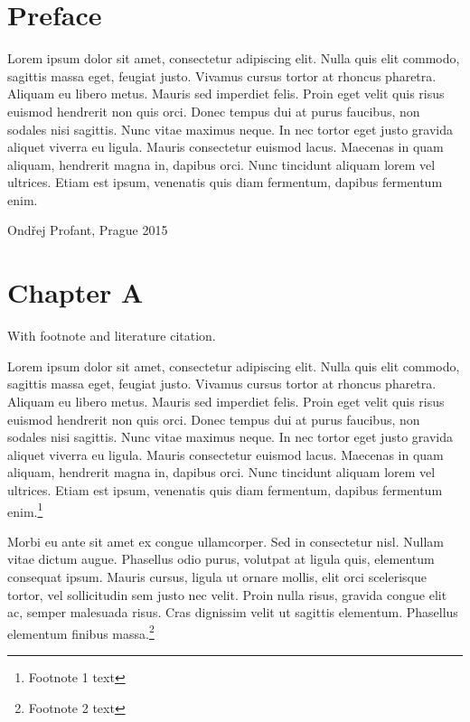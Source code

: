 
\def\mytitle{Example book}
\def\myauthor{John Doe}
\def\latexmode{memoir}
\def\blackandwhite{true}
\def\usexelatex{true}
\usepackage{tabularx}


\chapter{Preface}
\label{preface}

Lorem ipsum dolor sit amet, consectetur adipiscing elit. Nulla quis elit commodo, sagittis massa eget, feugiat justo. Vivamus cursus tortor at rhoncus pharetra. Aliquam eu libero metus. Mauris sed imperdiet felis. Proin eget velit quis risus euismod hendrerit non quis orci. Donec tempus dui at purus faucibus, non sodales nisi sagittis. Nunc vitae maximus neque. In nec tortor eget justo gravida aliquet viverra eu ligula. Mauris consectetur euismod lacus. Maecenas in quam aliquam, hendrerit magna in, dapibus orci. Nunc tincidunt aliquam lorem vel ultrices. Etiam est ipsum, venenatis quis diam fermentum, dapibus fermentum enim.

Ondřej Profant, Prague 2015

\chapter{Chapter A}
\label{chaptera}

With footnote and literature citation.

Lorem ipsum dolor sit amet, consectetur adipiscing elit. Nulla quis elit commodo, sagittis massa eget, feugiat justo. Vivamus cursus tortor at rhoncus pharetra. Aliquam eu libero metus. Mauris sed imperdiet felis. Proin eget velit quis risus euismod hendrerit non quis orci. Donec tempus dui at purus faucibus, non sodales nisi sagittis. Nunc vitae maximus neque. In nec tortor eget justo gravida aliquet viverra eu ligula. Mauris consectetur euismod lacus. Maecenas in quam aliquam, hendrerit magna in, dapibus orci. Nunc tincidunt aliquam lorem vel ultrices. Etiam est ipsum, venenatis quis diam fermentum, dapibus fermentum enim.\footnote{Footnote 1 text}

Morbi eu ante sit amet ex congue ullamcorper. Sed in consectetur nisl. Nullam vitae dictum augue. Phasellus odio purus, volutpat at ligula quis, elementum consequat ipsum. Mauris cursus, ligula ut ornare mollis, elit orci scelerisque tortor, vel sollicitudin sem justo nec velit. Proin nulla risus, gravida congue elit ac, semper malesuada risus. Cras dignissim velit ut sagittis elementum. Phasellus elementum finibus massa.\footnote{Footnote 2 text}


